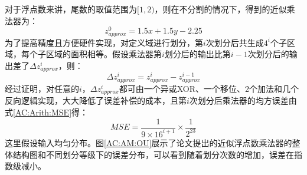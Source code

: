 对于浮点数来讲，尾数的取值范围为$[1,2)$，则在不分割的情况下，得到的近似乘法器为：
\begin{equation}
    z^0_{approx} = 1.5 x + 1.5 y - 2.25
\end{equation}
为了提高精度且方便硬件实现，对定义域进行划分，第$i$次划分后共生成$4^i$个子区域，每个子区域的面积相等。假设乘法器第$i$划分后的输出比第$i-1$次划分后的输出差了$\Delta z^i_{approx}$，则：
\begin{equation}
    \Delta z^i_{approx} = z^i_{approx} -  z^{i-1}_{approx}
\end{equation}
经过证明，对任意的$i$，$\Delta z^i_{approx}$都可由一个异或XOR、一个移位、2个加法和几个反向逻辑实现，大大降低了误差补偿的成本，且第$i$次划分后乘法器的均方误差由式\eqref{AC:Arith:MSE}得：
\begin{equation}
    MSE = \frac{1}{9\times 16^{i + 1}} \times \frac{1}{2^{23}}
\end{equation}
这里假设输入均匀分布。图\ref{AC:AM:OU}展示了论文提出的近似浮点数乘法器的整体结构图和不同划分等级下的误差分布，可以看到随着划分次数的增加，误差在指数级减小。
